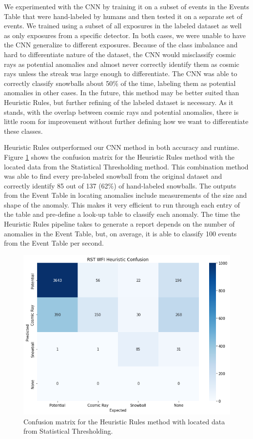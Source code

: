 We experimented with the CNN by training it on a subset of events in the Events Table that were hand-labeled by humans and then tested it on a separate set of events. 
We trained using a subset of all exposures in the labeled dataset as well as only exposures from a specific detector.
In both cases, we were unable to have the CNN generalize to different exposures. 
Because of the class imbalance and hard to differentiate nature of the dataset, the CNN would misclassify cosmic rays as potential anomalies and almost never correctly identify them as cosmic rays unless the streak was large enough to differentiate. 
The CNN was able to correctly classify snowballs about 50\% of the time, labeling them as potential anomalies in other cases. 
In the future, this method may be better suited than Heuristic Rules, but further refining of the labeled dataset is necessary.
As it stands, with the overlap between cosmic rays and potential anomalies, there is little room for improvement without further defining how we want to differentiate these classes.

Heuristic Rules outperformed our CNN method in both accuracy and runtime.
Figure \ref{rst/fig:heuristic_confusion} shows the confusion matrix for the Heuristic Rules method with the located data from the Statistical Thresholding method.
This combination method was able to find every pre-labeled snowball from the original dataset and correctly identify 85 out of 137 (62\%) of hand-labeled snowballs. 
The outputs from the Event Table in locating anomalies include measurements of the size and shape of the anomaly. 
This makes it very efficient to run through each entry of the table and pre-define a look-up table to classify each anomaly. 
The time the Heuristic Rules pipeline takes to generate a report depends on the number of anomalies in the Event Table, but, on average, it is able to classify 100 events from the Event Table per second. 

\begin{figure}
    \centering
    \includegraphics[width=.7\textwidth]{figs/rst/heuristic_confusion.png}
    \caption[Confusion Matrix for Heuristic Rules with Statistical Thresholding]{Confusion matrix for the Heuristic Rules method with located data from Statistical Thresholding.}
    \label{rst/fig:heuristic_confusion}
\end{figure}

